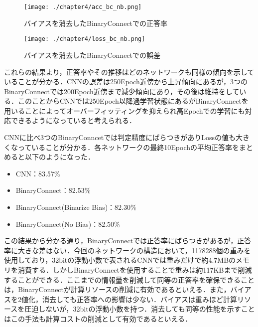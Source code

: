 \begin{figure}[htbp]
  \begin{minipage}[b]{0.45\linewidth}
    \centering
    \texttt{[image: ./chapter4/acc\_bc\_nb.png]}
    \caption{バイアスを消去したBinaryConnectでの正答率}
    \label{fig_acc_bc_nb}
  \end{minipage}
  \begin{minipage}[b]{0.45\linewidth}
    \centering
    \texttt{[image: ./chapter4/loss\_bc\_nb.png]}
    \caption{バイアスを消去したBinaryConnectでの誤差}
    \label{fig_loss_bc_nb}
  \end{minipage}
\end{figure}

これらの結果より，正答率やその推移はどのネットワークも同様の傾向を示していることが分かる．CNNの誤差は250Epoch近傍から上昇傾向にあるが，3つのBinaryConnectでは200Epoch近傍まで減少傾向にあり，その後は維持をしている．このことからCNNでは250Epoch以降過学習状態にあるがBinaryConnectを用いることによってオーバーフィッティングを抑えられ高Epochでの学習にも対応できるようになっていると考えられる．

CNNに比べ3つのBinaryConncetでは判定精度にばらつきがありLossの値も大きくなっていることが分かる．各ネットワークの最終10Epochの平均正答率をまとめると以下のようになった．
\begin{itemize}
  \item CNN：83.57\%
  \item BinaryConnect：82.53\%
  \item BinaryConnect(Binarize Bias)：82.30\%
  \item BinaryConnect(No Bias)：82.50\%
\end{itemize}

この結果から分かる通り，BinaryConnectでは正答率にばらつきがあるが，正答率に大きな差はない．今回のネットワークの構造において，1178288個の重みを使用しており，32bitの浮動小数で表されるCNNでは重みだけで約4.7MBのメモリを消費する．しかしBinaryConnectを使用することで重みは約117KBまで削減することができる．ここまでの情報量を削減して同等の正答率を確保できることは，BinaryConnectが計算リソースの削減に有効であるといえる．また，バイアスを2値化，消去しても正答率への影響は少ない．バイアスは重みほど計算リソースを圧迫しないが，32bitの浮動小数を持つ．消去しても同等の性能を示すことはこの手法も計算コストの削減として有効であるといえる．

